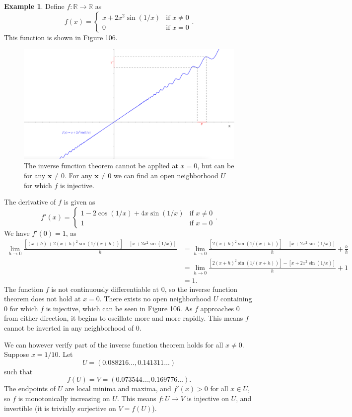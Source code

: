 \documentclass{article}
\newcommand{\R}{\mathbb{R}}
\newcommand{\x}{\mathbf{x}}
\theoremstyle{definition}
\newtheorem{example}{Example}[section]
\begin{document}
\begin{example}
	Define $ f:\R\to\R $ as $$ f(x)=\begin{cases}
		x+2x^2\sin(1/x)&\text{if } x\neq 0\\
		0&\text{if }x=0
	\end{cases}.$$
This function is shown in Figure 106. 
\begin{figure}[h!]
	\centering
	\includegraphics[width=0.9\linewidth]{figures/ivt_ex1}
	\caption{The inverse function theorem cannot be applied at $ x=0 $, but can be for any $ \x \neq 0 $. For any $ \x\neq 0 $ we can find an open neighborhood $ U $ for which $ f $ is injective. }
	\label{fig:ivtex1}
\end{figure}

The derivative of $ f $ is given as 
$$ f'(x)=\begin{cases}
	1-2\cos(1/x) + 4x\sin(1/x)&\text{if } x\neq 0\\
	1&\text{if }x=0
\end{cases}.$$
We have $ f'(0)=1 $, as 
\begin{align*}
	\lim_{h\to0}\frac{[(x+h)+2(x+h)^2\sin(1/(x+h))]-[x+2x^2\sin(1/x)]}{h} & = 	\lim_{h\to0}\frac{[2(x+h)^2\sin(1/(x+h))]-[x+2x^2\sin(1/x)]}{h} + \frac{h}{h} \\ & = \lim_{h\to0}\frac{[2(x+h)^2\sin(1/(x+h))]-[x+2x^2\sin(1/x)]}{h} + 1 \\ & = 1.
\end{align*}
The function $ f $ is not continuously differentiable at $ 0 $, so the inverse function theorem does not hold at $ x=0 $. There exists no open neighborhood $ U $ containing $ 0 $ for which $ f $ is injective, which can be seen in Figure 106. As $ f $ approaches $ 0 $ from either direction, it begins to oscillate more and more rapidly. This means $ f $ cannot be inverted in any neighborhood of $ 0 $.  

We can however verify part of the inverse function theorem holds for all $ x\neq 0 $. Suppose $ x = 1/10 $. Let $$ U = (0.088216\ldots , 0.141311\ldots) $$ such that $$ f(U)= V = (0.073544\ldots,0.169776\ldots).$$ The endpoints of $ U $ are local minima and maxima, and $ f'(x) > 0 $ for all $ x\in U $, so $ f $ is monotonically increasing on $ U $. This means $ f:U\to V $ is injective on $ U $, and invertible (it is trivially surjective on $ V=f(U) $).      
\end{example}
\end{document}
